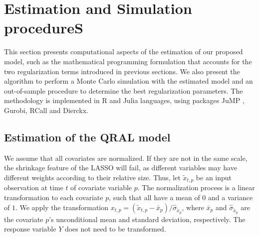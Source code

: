 \section{Estimation and Simulation procedureS} \label{sec:estimation-evaluation-simulation}


This section presents computational aspects of the estimation of our proposed model, such as the mathematical programming formulation that accounts for the two regularization terms introduced in previous sections. We also present the algorithm to perform a Monte Carlo simulation with the estimated model and an out-of-sample procedure to determine the best regularization parameters. The methodology is implemented in R \cite{rlanguage2008} and Julia \cite{bezanson2012julia} languages, using  packages JuMP \cite{DunningHuchetteLubin2017}, Gurobi, RCall and Dierckx. 


\subsection{Estimation of the QRAL model} \label{sec:qral-estimation}

We assume that all covariates are normalized. If they are not in the same scale, the shrinkage feature of the LASSO will fail, as different variables may have different weights according to their relative size. Thus, let $\tilde x_{t,p}$ be an input observation at time $t$ of covariate variable $p$.
The normalization process is a linear transformation to each covariate $p$, such that all have a mean of $0$ and a variance of $1$. 
We apply the transformation ${x}_{t,p} = (\tilde x_{t,p} - \bar{x}_{p}) / \hat\sigma_{\tilde x_{p}}$, where $\bar{x}_{p}$ and $\hat{\sigma}_{\tilde x_{p}}$ are the covariate $p$'s unconditional mean and standard deviation, respectively. The response variable $Y$ does not need to be transformed.

